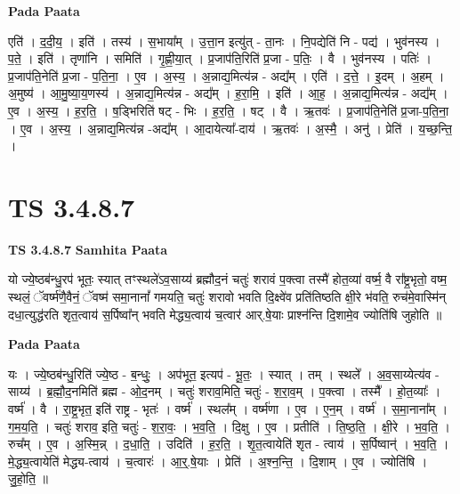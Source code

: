 \documentclass[17pt]{extarticle}
\begin{document}
\textbf{Pada Paata} \newline

एति॑ । द॒दी॒य॒ । इति॑ । तस्य॑ । स॒भाया᳚म् । उ॒त्ता॒न इत्यु॑त् - ता॒नः । नि॒पद्येति॑ नि - पद्य॑ । भुव॑नस्य । प॒ते॒ । इति॑ । तृणा॑नि । समिति॑ । गृ॒ह्णी॒या॒त् । प्र॒जाप॑ति॒रिति॑ प्र॒जा - प॒तिः॒ । वै । भुव॑नस्य । पतिः॑ । प्र॒जाप॑ति॒नेति॑ प्र॒जा - प॒ति॒ना॒ । ए॒व । अ॒स्य॒ । अ॒न्नाद्य॒मित्य॑न्न - अद्य᳚म् । एति॑ । द॒त्ते॒ । इ॒दम् । अ॒हम् । अ॒मुष्य॑ । आ॒मु॒ष्या॒य॒णस्य॑ । अ॒न्नाद्य॒मित्य॑न्न - अद्य᳚म् । ह॒रा॒मि॒ । इति॑ । आ॒ह॒ । अ॒न्नाद्य॒मित्य॑न्न - अद्य᳚म् । ए॒व । अ॒स्य॒ । ह॒र॒ति॒ । ष॒ड्भिरिति॑ षट् - भिः । ह॒र॒ति॒ । षट् । वै । ऋ॒तवः॑ । प्र॒जाप॑ति॒नेति॑ प्र॒जा-प॒ति॒ना॒ । ए॒व । अ॒स्य॒ । अ॒न्नाद्य॒मित्य॑न्न -अद्य᳚म् । आ॒दायेत्या᳚-दाय॑ । ऋ॒तवः॑ । अ॒स्मै॒ । अनु॑ । प्रेति॑ । य॒च्छ॒न्ति॒ ।  \newline




\section*{ TS 3.4.8.7 }

\textbf{TS 3.4.8.7 } \newline
\textbf{Samhita Paata} \newline

यो ज्ये॒ष्ठब॑न्धु॒रप॑ भूतः॒ स्यात् तꣳस्थले॑ऽव॒साय्य॑ ब्रह्मौद॒नं चतुः॑ शरावं प॒क्त्वा तस्मै॑ होत॒व्या॑ वर्ष्म॒ वै रा᳚ष्ट्र॒भृतो॒ वष्म॒ स्थलं॒ ॅवर्ष्म॑णै॒वैनं॒ ॅवष्म॑ समा॒नानां᳚ गमयति॒ चतुः॑ शरावो भवति दि॒क्ष्वे॑व प्रति॑तिष्ठति क्षी॒रे भ॑वति॒ रुच॑मे॒वास्मि॑न् दधा॒त्युद्ध॑रति शृत॒त्वाय॑ स॒र्पिष्वा᳚न् भवति मेद्ध्य॒त्वाय॑ च॒त्वार॑ आर्.षे॒याः प्राश्न॑न्ति दि॒शामे॒व ज्योति॑षि जुहोति ॥ \newline

\textbf{Pada Paata} \newline

यः । ज्ये॒ष्ठब॑न्धु॒रिति॑ ज्ये॒ष्ठ - ब॒न्धुः॒ । अप॑भूत॒ इत्यप॑ - भू॒तः॒ । स्यात् । तम् । स्थले᳚ । अ॒व॒साय्येत्य॑व - साय्य॑ । ब्र॒ह्मौ॒द॒नमिति॑ ब्रह्म - ओ॒द॒नम् । चतुः॑ शराव॒मिति॒ चतुः॑ - श॒रा॒व॒म् । प॒क्त्वा । तस्मै᳚ । हो॒त॒व्याः᳚ । वर्ष्म॑ । वै । रा॒ष्ट्र॒भृत॒ इति॑ राष्ट्र - भृतः॑ । वर्ष्म॑ । स्थल᳚म् । वर्ष्म॑णा । ए॒व । ए॒न॒म् । वर्ष्म॑ । स॒मा॒नाना᳚म् । ग॒म॒य॒ति॒ । चतुः॑ शराव॒ इति॒ चतुः॑ - श॒रा॒वः॒ । भ॒व॒ति॒ । दि॒क्षु । ए॒व । प्रतीति॑ । ति॒ष्ठ॒ति॒ । क्षी॒रे । भ॒व॒ति॒ । रुच᳚म् । ए॒व । अ॒स्मि॒न्न् । द॒धा॒ति॒ । उदिति॑ । ह॒र॒ति॒ । शृ॒त॒त्वायेति॑ शृत - त्वाय॑ । स॒र्पिष्वान्॑ । भ॒व॒ति॒ । मे॒द्ध्य॒त्वायेति॑ मेद्ध्य-त्वाय॑ । च॒त्वारः॑ । आ॒र्॒.षे॒याः । प्रेति॑ । अ॒श्न॒न्ति॒ । दि॒शाम् । ए॒व । ज्योति॑षि । जु॒हो॒ति॒ ॥  \newline
\end{document}
